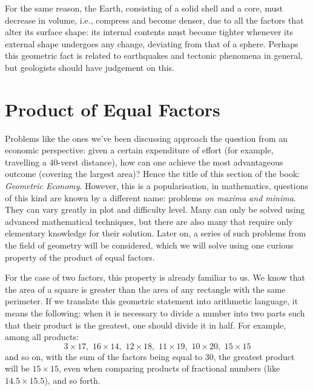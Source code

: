 For the same reason, the Earth, consisting of a solid shell and a core, must decrease in volume, i.e., compress and become denser, due to all the factors that alter its surface shape: its internal contents must become tighter whenever its external shape undergoes any change, deviating from that of a sphere. Perhaps this geometric fact is related to earthquakes and tectonic phenomena in general, but geologists should have judgement on this.

\section{Product of Equal Factors}
\label{sec-12.9}



Problems like the ones we've been discussing approach the question from an economic perspective: given a certain expenditure of effort (for example, travelling a 40-verst distance), how can one achieve the most advantageous outcome (covering the largest area)? Hence the title of this section of the book: \emph{Geometric Economy}. However, this is a popularisation, in mathematics, questions of this kind are known by a different name: problems \emph{on maxima and minima}. They can vary greatly in plot and difficulty level. Many can only be solved using advanced mathematical techniques, but there are also many that require only elementary knowledge for their solution. Later on, a series of such problems from the field of geometry will be considered, which we will solve using one curious property of the product of equal factors.

For the case of two factors, this property is already familiar to us. We know that the area of a square is greater than the area of any rectangle with the same perimeter. If we translate this geometric statement into arithmetic language, it means the following: when it is necessary to divide a number into two parts such that their product is the greatest, one should divide it in half. For example, among all products:
\begin{equation*}%
3 \times 17, \,\,  16 \times 14,\,\,  12 \times 18, \,\, 11 \times 19, \,\,  10 \times 20, \,\,  15 \times 15
\end{equation*}
and so on, with the sum of the factors being equal to 30, the greatest product will be $15 \times 15$, even when comparing products of fractional numbers (like $14.5 \times 15.5$), and so forth.


